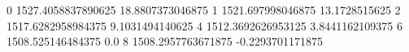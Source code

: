 0 1527.4058837890625 18.8807373046875
1 1521.697998046875 13.1728515625
2 1517.6282958984375 9.1031494140625
4 1512.3692626953125 3.8441162109375
6 1508.525146484375 0.0
8 1508.2957763671875 -0.2293701171875
